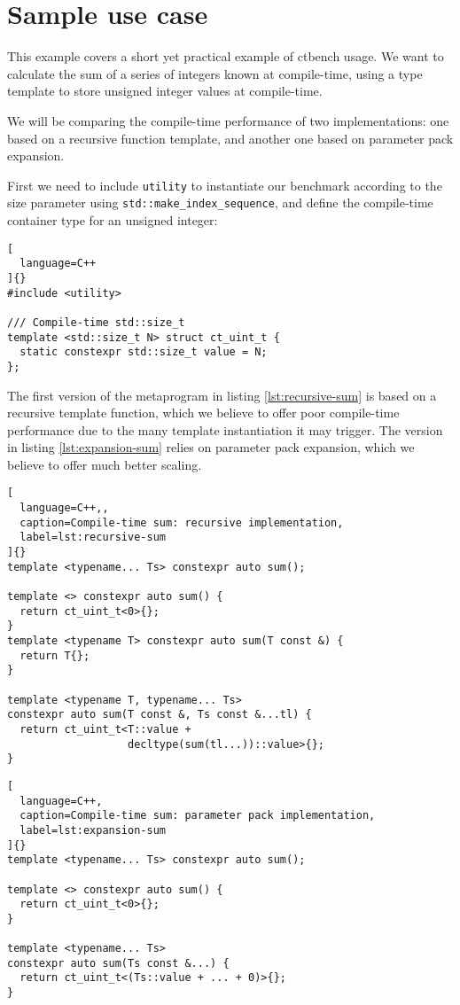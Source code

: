 \documentclass[../main]{subfiles}
\begin{document}
\section{
  Sample use case
}

This example covers a short yet practical example of ctbench usage. We want to
calculate the sum of a series of integers known at compile-time, using a type
template to store unsigned integer values at compile-time.

We will be comparing the compile-time performance of two implementations:
one based on a recursive function template,
and another one based on  parameter pack expansion.

First we need to include \lstinline{utility} to instantiate our benchmark
according to the size parameter using \lstinline{std::make_index_sequence}, and
define the compile-time container type for an unsigned integer:

\begin{lstlisting}[
  language=C++
]{}
#include <utility>

/// Compile-time std::size_t
template <std::size_t N> struct ct_uint_t {
  static constexpr std::size_t value = N;
};
\end{lstlisting}

The first version of the metaprogram in listing \ref{lst:recursive-sum} is based on a recursive template function,
which we believe to offer poor compile-time performance due to the many
template instantiation it may trigger.
The version in listing \ref{lst:expansion-sum} relies on 
parameter pack expansion, which we believe to offer much better scaling.

\begin{lstlisting}[
  language=C++,,
  caption=Compile-time sum: recursive implementation,
  label=lst:recursive-sum
]{}
template <typename... Ts> constexpr auto sum();

template <> constexpr auto sum() {
  return ct_uint_t<0>{};
}
template <typename T> constexpr auto sum(T const &) {
  return T{};
}

template <typename T, typename... Ts>
constexpr auto sum(T const &, Ts const &...tl) {
  return ct_uint_t<T::value +
                   decltype(sum(tl...))::value>{};
}
\end{lstlisting}

\clearpage%

\begin{lstlisting}[
  language=C++,
  caption=Compile-time sum: parameter pack implementation,
  label=lst:expansion-sum
]{}
template <typename... Ts> constexpr auto sum();

template <> constexpr auto sum() {
  return ct_uint_t<0>{};
}

template <typename... Ts>
constexpr auto sum(Ts const &...) {
  return ct_uint_t<(Ts::value + ... + 0)>{};
}

\end{lstlisting}
\end{document}
